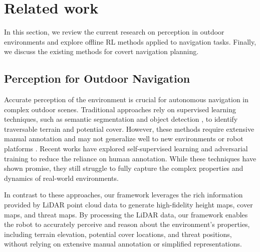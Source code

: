 \section{Related work}
\label{related_work}
In this section, we review the current research on perception in outdoor environments and explore offline RL methods applied to navigation tasks. Finally, we discuss the existing methods for covert navigation planning.
\subsection{Perception for Outdoor Navigation}
Accurate perception of the environment is crucial for autonomous navigation in complex outdoor scenes. Traditional approaches rely on supervised learning techniques, such as semantic segmentation \cite{sathyamoorthy2022terrapn} and object detection \cite{sathyamoorthy2020frozone}, to identify traversable terrain and potential cover. However, these methods require extensive manual annotation and may not generalize well to new environments or robot platforms \cite{papadakis2013terrain, weerakoon2022terp}.
Recent works have explored self-supervised learning \cite{sathyamoorthy2022terrapn} and adversarial training \cite{fan2020learning} to reduce the reliance on human annotation. While these techniques have shown promise, they still struggle to fully capture the complex properties and dynamics of real-world environments.


In contrast to these approaches, our framework leverages the rich information provided by LiDAR point cloud data to generate high-fidelity height maps, cover maps, and threat maps. By processing the LiDAR data, our framework enables the robot to accurately perceive and reason about the environment's properties, including terrain elevation, potential cover locations, and threat positions, without relying on extensive manual annotation or simplified representations. 


